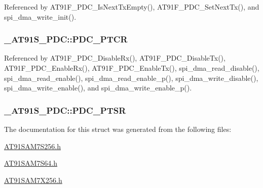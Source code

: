 Referenced by AT91F\_\-PDC\_\-IsNextTxEmpty(), AT91F\_\-PDC\_\-SetNextTx(), and spi\_\-dma\_\-write\_\-init().\hypertarget{struct__AT91S__PDC_f54cc3edd8cf870f581ca7f598e2e9ba}{
\subsubsection{ {\bf \_\-AT91S\_\-PDC::PDC\_\-PTCR}}}
\label{struct__AT91S__PDC_f54cc3edd8cf870f581ca7f598e2e9ba}




Referenced by AT91F\_\-PDC\_\-DisableRx(), AT91F\_\-PDC\_\-DisableTx(), AT91F\_\-PDC\_\-EnableRx(), AT91F\_\-PDC\_\-EnableTx(), spi\_\-dma\_\-read\_\-disable(), spi\_\-dma\_\-read\_\-enable(), spi\_\-dma\_\-read\_\-enable\_\-p(), spi\_\-dma\_\-write\_\-disable(), spi\_\-dma\_\-write\_\-enable(), and spi\_\-dma\_\-write\_\-enable\_\-p().\hypertarget{struct__AT91S__PDC_534356e87aed2a4f5c6e1c4370f4afcf}{
\subsubsection{ {\bf \_\-AT91S\_\-PDC::PDC\_\-PTSR}}}
\label{struct__AT91S__PDC_534356e87aed2a4f5c6e1c4370f4afcf}




The documentation for this struct was generated from the following files:\begin{CompactItemize}
\item 
\hyperlink{AT91SAM7S256_8h}{AT91SAM7S256.h}\item 
\hyperlink{AT91SAM7S64_8h}{AT91SAM7S64.h}\item 
\hyperlink{AT91SAM7X256_8h}{AT91SAM7X256.h}\end{CompactItemize}
